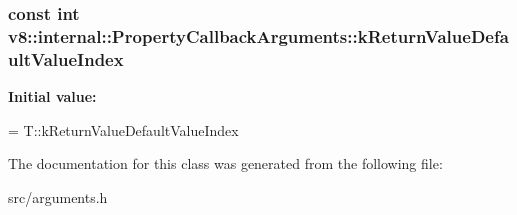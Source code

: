 \subsubsection[{k\+Return\+Value\+Default\+Value\+Index}]{\setlength{\rightskip}{0pt plus 5cm}const int v8\+::internal\+::\+Property\+Callback\+Arguments\+::k\+Return\+Value\+Default\+Value\+Index\hspace{0.3cm}{\ttfamily [static]}}\label{classv8_1_1internal_1_1_property_callback_arguments_af4efd2b3fe140e2f70f82a004ea9cd4a}
{\bfseries Initial value\+:}
\begin{DoxyCode}
=
      T::kReturnValueDefaultValueIndex
\end{DoxyCode}


The documentation for this class was generated from the following file\+:\begin{DoxyCompactItemize}
\item 
src/arguments.\+h\end{DoxyCompactItemize}
